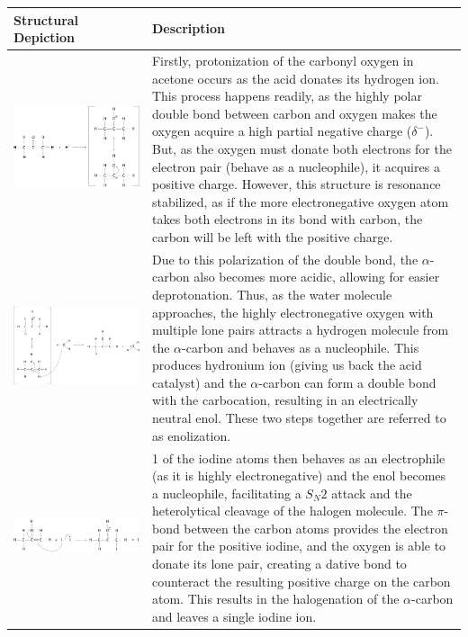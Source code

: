 \begin{table}[h!]
\centering
\begin{tabular}{m{6cm} m{10cm}} 
 \toprule
 Structural Depiction & Description \TBstrut\\
 \midrule
 \includegraphics[width=.35\textwidth]{fig/images/mechanism/protonization.pdf} & Firstly, protonization of the carbonyl oxygen in acetone occurs as the acid donates its hydrogen ion. This process happens readily, as the highly polar double bond between carbon and oxygen makes the oxygen acquire a high partial negative charge ($\delta^-$). But, as the oxygen must donate both electrons for the electron pair (behave as a nucleophile), it acquires a positive charge. However, this structure is resonance stabilized, as if the more electronegative oxygen atom takes both electrons in its bond with carbon, the carbon will be left with the positive charge. \\
 \midrule
 \includegraphics[width=.35\textwidth]{fig/images/mechanism/hydration.pdf} & Due to this polarization of the double bond, the $\alpha$-carbon also becomes more acidic, allowing for easier deprotonation. Thus, as the water molecule approaches, the highly electronegative oxygen with multiple lone pairs attracts a hydrogen molecule from the $\alpha$-carbon and behaves as a nucleophile. This produces hydronium ion (giving us back the acid catalyst) and the $\alpha$-carbon can form a double bond with the carbocation, resulting in an electrically neutral enol. These two steps together are referred to as enolization. \\
	\midrule
 \includegraphics[width=.35\textwidth]{fig/images/mechanism/sn2.pdf} & 1 of the iodine atoms then behaves as an electrophile (as it is highly electronegative) and the enol becomes a nucleophile, facilitating a $S_N2$ attack and the heterolytical cleavage of the halogen molecule. The $\pi$-bond between the carbon atoms provides the electron pair for the positive iodine, and the oxygen is able to donate its lone pair, creating a dative bond to counteract the resulting positive charge on the carbon atom. This results in the halogenation of the $\alpha$-carbon and leaves a single iodine ion. \\

\end{tabular}
\end{table}
